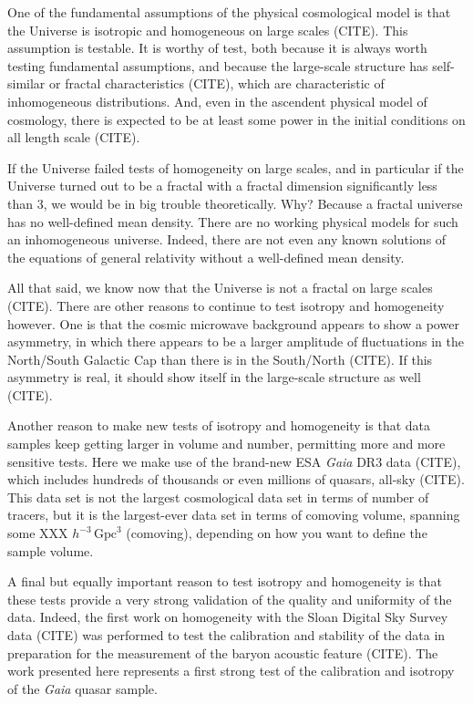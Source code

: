 \documentclass[modern]{aastex631}
\newcommand{\unit}[1]{\mathrm{#1}}
\newcommand{\Gpc}{\unit{Gpc}}
\begin{document}
One of the fundamental assumptions of the physical cosmological model is that the Universe is isotropic and homogeneous on large scales (CITE).
This assumption is testable.
It is worthy of test, both because it is always worth testing fundamental assumptions, and because the large-scale structure has self-similar or fractal characteristics (CITE), which are characteristic of inhomogeneous distributions.
And, even in the ascendent physical model of cosmology, there is expected to be at least some power in the initial conditions on all length scale (CITE).

If the Universe failed tests of homogeneity on large scales, and in particular if the Universe turned out to be a fractal with a fractal dimension significantly less than 3, we would be in big trouble theoretically.
Why?
Because a fractal universe has no well-defined mean density.
There are no working physical models for such an inhomogeneous universe.
Indeed, there are not even any known solutions of the equations of general relativity without a well-defined mean density.

All that said, we know now that the Universe is not a fractal on large scales (CITE).
There are other reasons to continue to test isotropy and homogeneity however.
One is that the cosmic microwave background appears to show a power asymmetry, in which there appears to be a larger amplitude of fluctuations in the North/South Galactic Cap than there is in the South/North (CITE).
If this asymmetry is real, it should show itself in the large-scale structure as well (CITE).

Another reason to make new tests of isotropy and homogeneity is that data samples keep getting larger in volume and number, permitting more and more sensitive tests.
Here we make use of the brand-new ESA \textsl{Gaia} DR3 data (CITE), which includes hundreds of thousands or even millions of quasars, all-sky (CITE).
This data set is not the largest cosmological data set in terms of number of tracers, but it is the largest-ever data set in terms of comoving volume, spanning some XXX $h^{-3}\,\Gpc^3$ (comoving), depending on how you want to define the sample volume.

A final but equally important reason to test isotropy and homogeneity is that these tests provide a very strong validation of the quality and uniformity of the data.
Indeed, the first work on homogeneity with the Sloan Digital Sky Survey data (CITE) was performed to test the calibration and stability of the data in preparation for the measurement of the baryon acoustic feature (CITE).
The work presented here represents a first strong test of the calibration and isotropy of the \textsl{Gaia} quasar sample.
\end{document}
